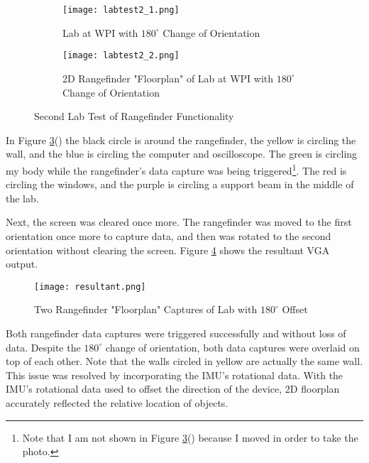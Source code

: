 \begin{figure}[H] 
	\begin{subfigure}{1\textwidth}
	\centering
		\texttt{[image: labtest2\_1.png]}
		\caption{Lab at WPI with $180^\circ$ Change of Orientation}
		\label{lab2}
	\end{subfigure}
	\begin{subfigure}{1\textwidth}
	\centering
		\texttt{[image: labtest2\_2.png]}
		\caption{2D Rangefinder "Floorplan" of Lab at WPI with $180^\circ$ Change of Orientation}
		\label{floorplan2}
	\end{subfigure}
	\caption{Second Lab Test of Rangefinder Functionality}
	\label{labtest2}
\end{figure}

In Figure \ref{labtest2}() the black circle is around the rangefinder, the yellow is circling the wall, and the blue is circling the computer and oscilloscope. The green is circling my body while the rangefinder's data capture was being triggered\footnote{Note that I am not shown in Figure \ref{labtest2}() because I moved in order to take the photo.}. The red is circling the windows, and the purple is circling a support beam in the middle of the lab.
\par
Next, the screen was cleared once more. The rangefinder was moved to the first orientation once more to capture data, and then was rotated to the second orientation without clearing the screen. Figure \ref{resultant} shows the resultant VGA output.

\begin{figure}[H]
	\centerline{\texttt{[image: resultant.png]}}
	\caption{Two Rangefinder "Floorplan" Captures of Lab with $180^\circ$ Offset}
	\label{resultant}
\end{figure}

Both rangefinder data captures were triggered successfully and without loss of data. Despite the $180^\circ$ change of orientation, both data captures were overlaid on top of each other. Note that the walls circled in yellow are actually the same wall. This issue was resolved by incorporating the IMU's rotational data. With the IMU's rotational data used to offset the direction of the device, 2D floorplan accurately reflected the relative location of objects.




